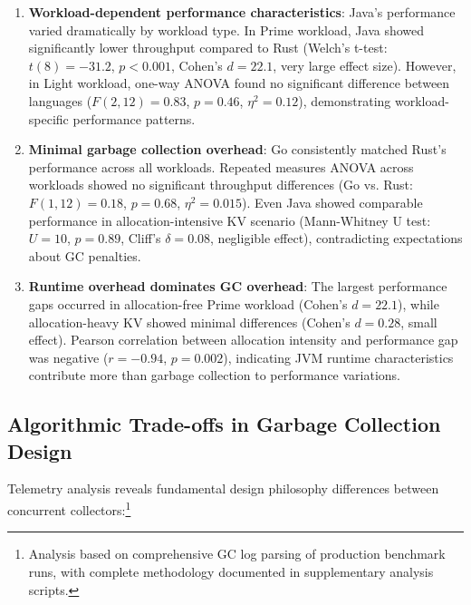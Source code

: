 \documentclass{article}
\begin{document}
\begin{enumerate}
    \item \textbf{Workload-dependent performance characteristics}: Java's performance varied dramatically by workload type. In Prime workload, Java showed significantly lower throughput compared to Rust (Welch's t-test: $t(8)=-31.2$, $p<0.001$, Cohen's $d=22.1$, very large effect size). However, in Light workload, one-way ANOVA found no significant difference between languages ($F(2,12)=0.83$, $p=0.46$, $\eta^2=0.12$), demonstrating workload-specific performance patterns.
    
    \item \textbf{Minimal garbage collection overhead}: Go consistently matched Rust's performance across all workloads. Repeated measures ANOVA across workloads showed no significant throughput differences (Go vs. Rust: $F(1,12)=0.18$, $p=0.68$, $\eta^2=0.015$). Even Java showed comparable performance in allocation-intensive KV scenario (Mann-Whitney U test: $U=10$, $p=0.89$, Cliff's $\delta=0.08$, negligible effect), contradicting expectations about GC penalties.
    
    \item \textbf{Runtime overhead dominates GC overhead}: The largest performance gaps occurred in allocation-free Prime workload (Cohen's $d=22.1$), while allocation-heavy KV showed minimal differences (Cohen's $d=0.28$, small effect). Pearson correlation between allocation intensity and performance gap was negative ($r=-0.94$, $p=0.002$), indicating JVM runtime characteristics contribute more than garbage collection to performance variations.
\end{enumerate}

\subsection{Algorithmic Trade-offs in Garbage Collection Design}

Telemetry analysis reveals fundamental design philosophy differences between concurrent collectors:\footnote{Analysis based on comprehensive GC log parsing of production benchmark runs, with complete methodology documented in supplementary analysis scripts.}
\end{document}
